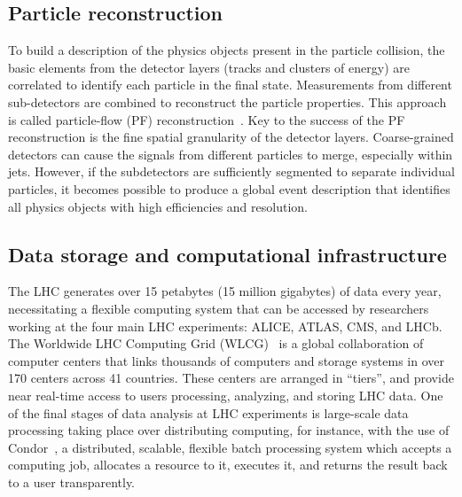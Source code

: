 \subsection{Particle reconstruction}
To build a description of the physics objects present in the particle collision, the basic elements from the detector layers (tracks and clusters of energy) are correlated to identify each particle in the final state. Measurements from different sub-detectors are combined to reconstruct the particle properties. This approach is called particle-flow (PF) reconstruction~\cite{CERN-EP-2017-110}. Key to the success of the PF reconstruction is the fine spatial granularity of the detector layers. Coarse-grained detectors can cause the signals from different particles to merge, especially within jets. However, if the subdetectors are sufficiently segmented to separate individual particles, it becomes possible to produce a global event description that identifies all physics objects with high efficiencies and resolution.

\subsection{Data storage and computational infrastructure}

The LHC generates over 15 petabytes (15 million gigabytes) of data every year, necessitating a flexible computing system that can be accessed by researchers working at the four main LHC experiments: ALICE, ATLAS, CMS, and LHCb. The Worldwide LHC Computing Grid (WLCG)~\cite{computing-Worldwide:1997398} is a global collaboration of computer centers that links thousands of computers and storage systems in over 170 centers across 41 countries. These centers are arranged in ``tiers'', and provide near real-time access to users processing, analyzing, and storing LHC data. One of the final stages of data analysis at LHC experiments is large-scale data processing taking place over distributing computing, for instance, with the use of Condor~\cite{condor-article}, a distributed, scalable, flexible batch processing system which accepts a computing job, allocates a resource to it, executes it, and returns the result back to a user transparently. 
 
